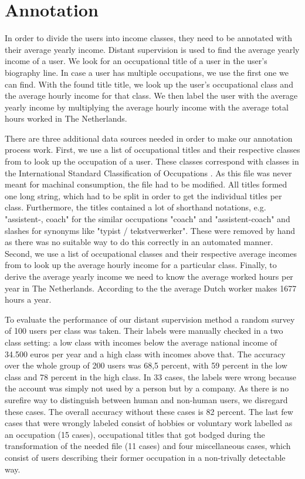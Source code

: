 \documentclass[
10pt, %
a4paper, %
oneside, %
headinclude,footinclude, %
] {book}%
\begin{document}
\section{Annotation}

In order to divide the users into income classes, they need to be annotated with their average yearly income. Distant supervision is used to find the average yearly income of a user. We look for an occupational title of a user in the user's biography line. In case a user has multiple occupations, we use the first one we can find. With the found title title, we look up the user's occupational class and the average hourly income for that class. We then label the user with the average yearly income by multiplying the average hourly income with the average total hours worked in The Netherlands. 

There are three additional data sources needed in order to make our annotation process work. First, we use a list of occupational titles and their respective classes from \citet{codelijsten} to look up the occupation of a user. These classes correspond with classes in the International Standard Classification of Occupations \citep{isco}. As this file was never meant for machinal consumption, the file had to be modified. All titles formed one long string, which had to be split in order to get the individual titles per class. Furthermore, the titles contained a lot of shorthand notations, e.g. "assistent-, coach" for the similar occupations "coach" and "assistent-coach" and slashes for synonyms like "typist / tekstverwerker". These were removed by hand as there was no suitable way to do this correctly in an automated manner. Second, we use a list of occupational classes and their respective average incomes from \citet{uurlonen} to look up the average hourly income for a particular class. Finally, to derive the average yearly income we need to know the average worked hours per year in The Netherlands. According to the \citet{hours} the average Dutch worker makes 1677 hours a year.

To evaluate the performance of our distant supervision method a random survey of 100 users per class was taken. Their labels were manually checked in a two class setting: a low class with incomes below the average national income of 34.500 euros per year and a high class with incomes above that. The accuracy over the whole group of 200 users was 68,5 percent, with 59 percent in the low class and 78 percent in the high class. In 33 cases, the labels were wrong because the account was simply not used by a person but by a company. As there is no surefire way to distinguish between human and non-human users, we disregard these cases. The overall accuracy without these cases is 82 percent. The last few cases that were wrongly labeled consist of hobbies or voluntary work labelled as an occupation (15 cases), occupational titles that got bodged during the transformation of the needed file (11 cases) and four miscellaneous cases, which consist of users describing their former occupation in a non-trivally detectable way.
\end{document}
